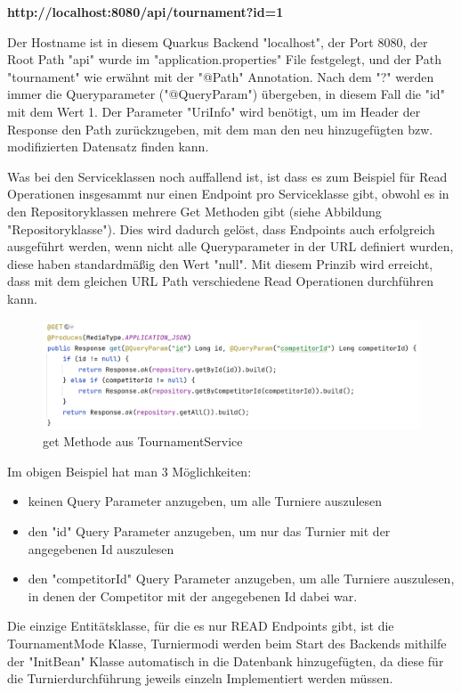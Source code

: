 \textbf{http://localhost:8080/api/tournament?id=1} 

Der Hostname ist in diesem Quarkus Backend "localhost", der Port 8080, der Root Path "api" wurde im "application.properties" File festgelegt, und der Path "tournament" wie erwähnt mit der "@Path" Annotation. 
Nach dem "?" werden immer die Queryparameter ("@QueryParam") übergeben, in diesem Fall die "id" mit dem Wert 1. Der Parameter "UriInfo" wird benötigt, um im Header der Response den Path zurückzugeben, 
mit dem man den neu hinzugefügten bzw. modifizierten Datensatz finden kann.

Was bei den Serviceklassen noch auffallend ist, ist dass es zum Beispiel für Read Operationen insgesammt nur einen Endpoint pro Serviceklasse gibt, obwohl es in den Repositoryklassen mehrere Get Methoden gibt (siehe Abbildung "Repositoryklasse").
Dies wird dadurch gelöst, dass Endpoints auch erfolgreich ausgeführt werden, wenn nicht alle Queryparameter in der URL definiert wurden, diese haben standardmäßig den Wert "null". Mit diesem Prinzib wird erreicht, dass mit dem gleichen URL Path 
verschiedene Read Operationen durchführen kann.

\begin{figure}[H]
    \includegraphics[scale=0.5]{pics/backend/service_get_function.png}
    \caption{get Methode aus TournamentService}
\end{figure}

Im obigen Beispiel hat man 3 Möglichkeiten:

\begin{itemize}
    \item keinen Query Parameter anzugeben, um alle Turniere auszulesen
    \item den "id" Query Parameter anzugeben, um nur das Turnier mit der angegebenen Id auszulesen
    \item den "competitorId" Query Parameter anzugeben, um alle Turniere auszulesen, in denen der Competitor mit der angegebenen Id dabei war.
\end{itemize}

Die einzige Entitätsklasse, für die es nur READ Endpoints gibt, ist die TournamentMode Klasse, Turniermodi werden beim Start des Backends mithilfe der "InitBean" Klasse 
automatisch in die Datenbank hinzugefügten, da diese für die Turnierdurchführung jeweils einzeln Implementiert werden müssen.

